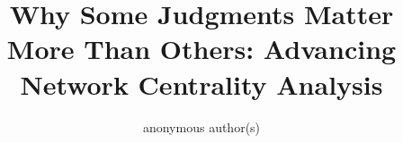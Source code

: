 \documentclass[sigconf,authordraft]{acmart}
\begin{document}
\title{Why Some Judgments Matter More Than Others: Advancing Network Centrality Analysis}

%

\author{anonymous author(s)}





\renewcommand{\shortauthors}{anonymous author(s)}
\end{document}
